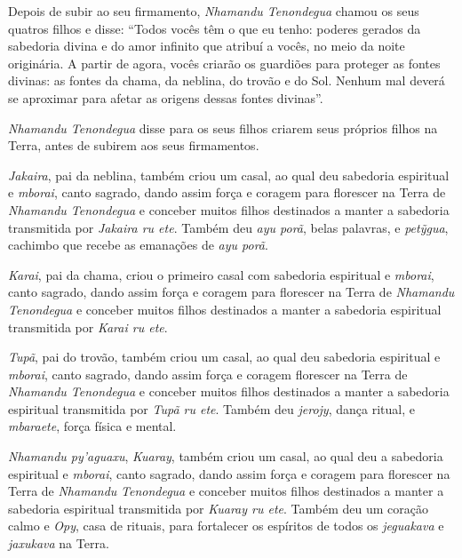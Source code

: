 
 



Depois de subir ao seu firmamento, \emph{Nhamandu Tenondegua} chamou os
seus quatros filhos e disse: ``Todos vocês têm o que eu tenho: poderes
gerados da sabedoria divina e do amor infinito que atribuí a vocês, no
meio da noite originária. A partir de agora, vocês criarão os guardiões
para proteger as fontes divinas: as fontes da chama, da neblina, do
trovão e do Sol. Nenhum mal deverá se aproximar para afetar as origens
dessas fontes divinas''.

\emph{Nhamandu Tenondegua} disse para os seus filhos criarem seus
próprios filhos na Terra, antes de subirem aos seus firmamentos.

\emph{Jakaira}, pai da neblina, também criou um casal, ao qual deu
sabedoria espiritual e \emph{mborai}, canto sagrado, dando assim força e
coragem para florescer na Terra de \emph{Nhamandu Tenondegua} e conceber
muitos filhos destinados a manter a sabedoria transmitida por
\emph{Jakaira ru ete}. Também deu \emph{ayu porã}, belas palavras, e
\emph{petỹgua}, cachimbo que recebe as emanações de \emph{ayu porã}.


 

\emph{Karai}, pai da chama, criou o primeiro casal com sabedoria
espiritual e \emph{mborai}, canto sagrado, dando assim força e coragem
para florescer na Terra de \emph{Nhamandu Tenondegua} e conceber muitos
filhos destinados a manter a sabedoria espiritual transmitida por
\emph{Karai ru ete}.

\emph{Tupã}, pai do trovão, também criou um casal, ao qual deu sabedoria
espiritual e \emph{mborai}, canto sagrado, dando assim força e coragem
florescer na Terra de \emph{Nhamandu Tenondegua} e conceber muitos
filhos destinados a manter a sabedoria espiritual transmitida por
\emph{Tupã ru ete}. Também deu \emph{jerojy}, dança ritual, e
\emph{mbaraete}, força física e mental.

\emph{Nhamandu py'aguaxu}, \emph{Kuaray}, também criou um casal, ao qual
deu a sabedoria espiritual e \emph{mborai}, canto sagrado, dando assim
força e coragem para florescer na Terra de \emph{Nhamandu}
\emph{Tenondegua} e conceber muitos filhos destinados a manter a
sabedoria espiritual transmitida por \emph{Kuaray ru ete}. Também deu um
coração calmo e \emph{Opy}, casa de rituais, para fortalecer os
espíritos de todos os \emph{jeguakava} e \emph{jaxukava} na Terra.


